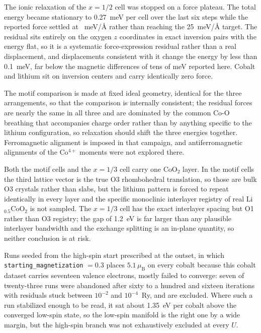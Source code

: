 \documentclass[reprint,twocolumn,prb,amsmath,amssymb,superscriptaddress,floatfix]{revtex4-2}
\newcommand{\muBs}{\mu_{\mathrm{B}}}
\begin{document}
The ionic relaxation of the $x=1/2$ cell was stopped on a force plateau. The total energy became
stationary to 0.27~meV per cell over the last six steps while the reported force settled at
\forcePlateau~meV/\AA{} rather than reaching the 25~meV/\AA{} target. The residual sits entirely on the
oxygen $z$ coordinates in exact inversion pairs with the energy flat, so it is a systematic
force-expression residual rather than a real displacement, and displacements consistent with it
change the energy by less than 0.1~meV, far below the magnetic differences of tens of meV
reported here. Cobalt and lithium sit on inversion centers and carry identically zero force.

The motif comparison is made at fixed ideal geometry, identical for the three arrangements, so
that the comparison is internally consistent; the residual forces are nearly the same in all
three and are dominated by the common Co-O breathing that accompanies charge order rather than
by anything specific to the lithium configuration, so relaxation should shift the three energies
together. Ferromagnetic alignment is imposed in that campaign, and antiferromagnetic alignments
of the Co$^{4+}$ moments were not explored there.

Both the motif cells and the $x=1/3$ cell carry one CoO$_2$ layer. In the motif cells the third
lattice vector is the true O3 rhombohedral translation, so those are bulk O3 crystals rather
than slabs, but the lithium pattern is forced to repeat identically in every layer and the
specific monoclinic interlayer registry of real Li$_{0.5}$CoO$_2$ is not sampled. The $x=1/3$
cell has the exact interlayer spacing but O1 rather than O3 registry; the gap of 1.2~eV is far
larger than any plausible interlayer bandwidth and the exchange splitting is an in-plane
quantity, so neither conclusion is at risk.

Runs seeded from the high-spin start prescribed at the outset, in which
\texttt{starting\_magnetization} $=0.3$ places $5.1\,\muBs$ on every cobalt because this cobalt
dataset carries seventeen valence electrons, mostly failed to converge: seven of twenty-three
runs were abandoned after sixty to a hundred and sixteen iterations with residuals stuck between
$10^{-2}$ and $10^{-4}$~Ry, and are excluded. Where such a run stabilized enough to be read, it
sat about 1.35~eV per cobalt above the converged low-spin state, so the low-spin manifold is the
right one by a wide margin, but the high-spin branch was not exhaustively excluded at every $U$.
\end{document}
